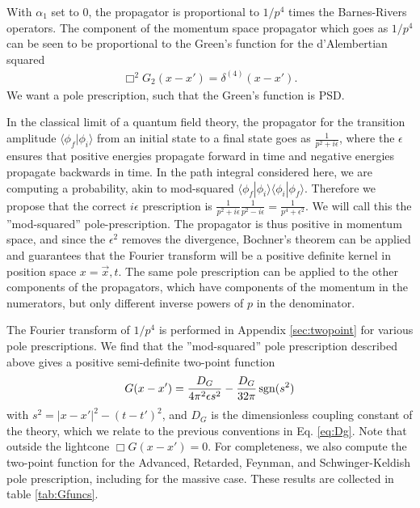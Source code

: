 \documentclass[aps,preprintnumbers,superscriptaddress,longbibliography]{revtex4-1}
\begin{document}
With $\alpha_1$ set to $0$, the propagator is proportional to $1/p^4$ times the Barnes-Rivers operators. The component of the momentum space propagator which goes as $1/p^4$ can be seen to be proportional to the Green's function for the d'Alembertian squared
\begin{align}
    \Box^2 G_{2}(x-x')=\delta^{(4)}(x-x').
    \label{eq:boxsquared}
\end{align}
We want a pole prescription, such that the Green's function is PSD.


In the classical limit of a quantum field theory, the propagator for the transition amplitude  $\langle \phi_f|\phi_i\rangle$ from an initial state to a final state goes as $\frac{1}{p^2+i\epsilon}$, where the $\epsilon$ ensures that positive energies propagate forward in time and negative energies propagate backwards in time.
In the path integral considered here, we are computing a probability, akin to mod-squared $\langle \phi_f|\phi_i\rangle\langle\phi_i|\phi_f\rangle$. Therefore we propose  that the correct $i\epsilon$ prescription is $\frac{1}{p^2+i\epsilon}\frac{1}{p^2-i\epsilon}=\frac{1}{p^4+\epsilon^2}$. We will call this the ''mod-squared'' pole-prescription. The propagator is thus positive in momentum space, and  since the $\epsilon^2$ removes the divergence, Bochner's theorem can be applied and guarantees that the Fourier transform will be a positive definite kernel in position space $x=\vec{x},t$.  The same pole prescription can be applied to the other components of the propagators, which have components of the momentum in the numerators, but only different inverse powers of $p$ in the denominator.


The Fourier transform of $1/p^4$ is performed  in Appendix \ref{sec:twopoint} for various pole prescriptions. We find that the ''mod-squared''
pole prescription described above gives a positive semi-definite two-point function
\begin{equation}
G(x-x') = \frac{D_G}{4\pi^2\epsilon s^2} -\frac{D_G}{32\pi} \operatorname{sgn}(s^2)
\end{equation}
with $s^2=|x-x'|^2-(t-t')^2$, and $D_G$ is the dimensionless coupling constant of the theory, which we relate to the previous conventions in Eq. \eqref{eq:Dg}. Note that outside the lightcone $\Box G(x-x')=0$.
%
%
For completeness, we also compute the two-point function for the Advanced, Retarded, Feynman, and Schwinger-Keldish pole prescription, including for the massive case.  These results are collected in table \ref{tab:Gfuncs}.
\end{document}
